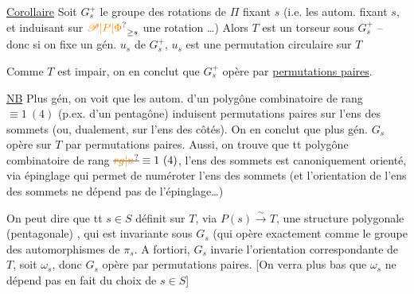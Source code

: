 \uline{Corollaire} Soit $G_s^+$ le groupe des rotations de $\Pi$ fixant $s$ (i.e. les autom. fixant $s$, et induisant sur $\unsure{\mathscr P|P|\Phi}_{\geq s}$ une rotation \ldots) Alors  $T$ est un torseur sous $G_s^+$ -- donc si on fixe un gén. $u_s$ de $G_s^+$, $u_s$ est une permutation circulaire sur $T$

Comme $T$ est  impair, on en conclut que $G_s^+$ opère par \uline{permutations paires}.

\uline{NB} Plus gén, on voit que les autom. d'un polygône combinatoire de rang  $\equiv 1\ (4)$ (p.ex. d'un pentagône) induisent
  permutations paires sur l'ens des sommets (ou, dualement, sur l'ens des côtés).  On en conclut que plus gén. $G_s$ opère  sur $T$ par permutations paires. Aussi, on trouve que  tt polygône combinatoire de rang $\deleted{\unsure{rg|n}}\equiv1\ (4)$, l'ens des sommets est canoniquement orienté, via épinglage qui permet de numéroter l'ens des sommets (et l'orientation de l'ens des sommets ne dépend pas de l'épinglage\ldots)

On peut  dire que tt $s\in S$ définit sur $T$, via $P(s)\xrightarrow{\sim}T$, une structure polygonale (pentagonale) , qui est invariante sous $G_s$ (qui opère exactement comme le groupe des automorphismes de $\pi_s$. A fortiori, $G_s$ invarie l'orientation correspondante de $T$, soit $\omega_s$, donc $G_s$ opère par permutations paires. [On verra plus bas que $\omega_s$ ne dépend pas en fait du choix de $s\in S$]

